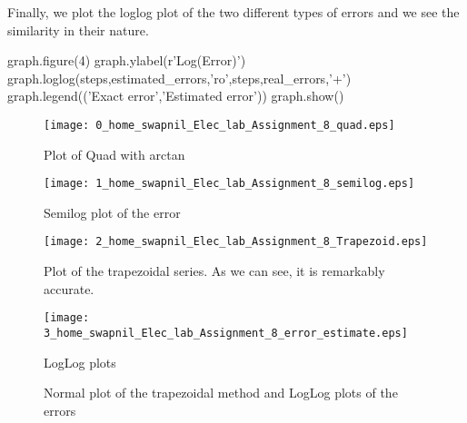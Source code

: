 \documentclass[canadian]{article}
\begin{document}
%
Finally, we plot the loglog plot of the two different types of errors
and we see the similarity in their nature.


\nwenddocs{}\endmoddef\nwstartdeflinemarkup\nwenddeflinemarkup

graph.figure(4)
graph.ylabel(r'Log(Error)')
graph.loglog(steps,estimated_errors,'ro',steps,real_errors,'+')
graph.legend(('Exact error','Estimated error'))
graph.show()
\nwendcode{}

%
%
%
%
%
%
%
%
%
\nwdocspar

%
\begin{figure}
\texttt{[image: 0\_home\_swapnil\_Elec\_lab\_Assignment\_8\_quad.eps]}

\caption{Plot of Quad with arctan}
\end{figure}


\begin{figure}
\texttt{[image: 1\_home\_swapnil\_Elec\_lab\_Assignment\_8\_semilog.eps]}

\caption{Semilog plot of the error}
\end{figure}


\begin{figure}
\texttt{[image: 2\_home\_swapnil\_Elec\_lab\_Assignment\_8\_Trapezoid.eps]}

Plot of the trapezoidal series. As we can see, it is remarkably accurate. 

\texttt{[image: 3\_home\_swapnil\_Elec\_lab\_Assignment\_8\_error\_estimate.eps]}

LogLog plots

\caption{Normal plot of the trapezoidal method and LogLog plots of the errors}
\end{figure}
\end{document}
